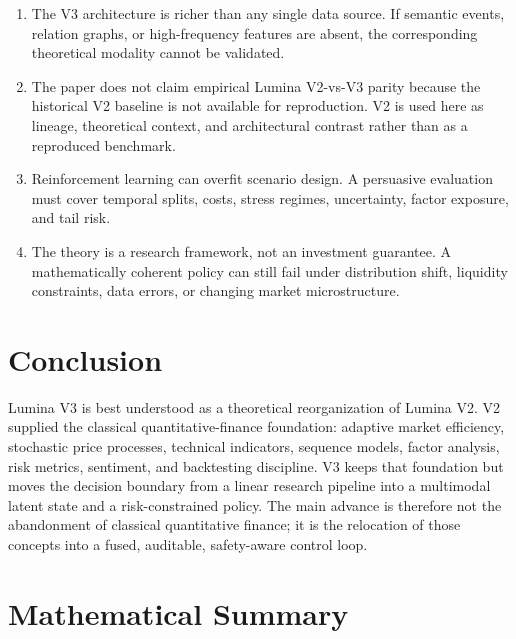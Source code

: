 \documentclass[10pt]{article}
\begin{document}
\begin{enumerate}
	\item The V3 architecture is richer than any single data source. If semantic events,
	      relation graphs, or high-frequency features are absent, the corresponding theoretical
	      modality cannot be validated.

	\item The paper does not claim empirical Lumina V2-vs-V3 parity because the historical V2
	      baseline is not available for reproduction. V2 is used here as lineage, theoretical
	      context, and architectural contrast rather than as a reproduced benchmark.

	\item Reinforcement learning can overfit scenario design. A persuasive evaluation must cover
	      temporal splits, costs, stress regimes, uncertainty, factor exposure, and tail risk.

	\item The theory is a research framework, not an investment guarantee. A mathematically
	      coherent policy can still fail under distribution shift, liquidity constraints, data
	      errors, or changing market microstructure.
\end{enumerate}

\section{Conclusion}

Lumina V3 is best understood as a theoretical reorganization of Lumina V2. V2 supplied the
classical quantitative-finance foundation: adaptive market efficiency, stochastic price
processes, technical indicators, sequence models, factor analysis, risk metrics, sentiment,
and backtesting discipline. V3 keeps that foundation but moves the decision boundary from a
linear research pipeline into a multimodal latent state and a risk-constrained policy. The
main advance is therefore not the abandonment of classical quantitative finance; it is the
relocation of those concepts into a fused, auditable, safety-aware control loop.

\appendix

\section{Mathematical Summary}
\end{document}
